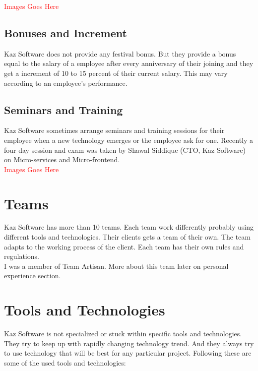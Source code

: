 \textcolor{red}{\LARGE Images Goes Here}

\subsection{Bonuses and Increment}

Kaz Software does not provide any festival bonus.
But they provide a bonus equal to the salary of a employee after every anniversary of their joining and they get a increment of 10 to 15 percent of their current salary.
This may vary according to an employee's performance.

\subsection{Seminars and Training}

Kaz Software sometimes arrange seminars and training sessions for their employee when a new technology emerges or the employee ask for one.
Recently a four day session and exam was taken by Shawal Siddique (CTO, Kaz Software) on Micro-services and Micro-frontend.
\\

\textcolor{red}{\LARGE Images Goes Here}

\section{Teams}

Kaz Software has more than 10 teams.
Each team work differently probably using different tools and technologies.
Their clients gets a team of their own.
The team adapts to the working process of the client.
Each team has their own rules and regulations.\\

I was a member of Team Artisan.
More about this team later on personal experience section.

\section{Tools and Technologies}

Kaz Software is not specialized or stuck within specific tools and technologies.
They try to keep up with rapidly changing technology trend.
And they always try to use technology that will be best for any particular project.
Following these are some of the used tools and technologies:

